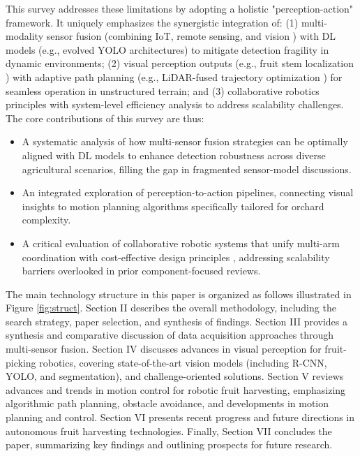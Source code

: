 \documentclass[a4paper,fleqn]{cas-dc}
\begin{document}
This survey addresses these limitations by adopting a holistic "perception-action" framework. It uniquely emphasizes the synergistic integration of: (1) multi-modality sensor fusion (combining IoT, remote sensing, and vision \cite{mohamed2021smart,martos2021ensuring,liu2024hierarchical}) with DL models (e.g., evolved YOLO architectures) to mitigate detection fragility in dynamic environments; (2) visual perception outputs (e.g., fruit stem localization \cite{li2023mta}) with adaptive path planning (e.g., LiDAR-fused trajectory optimization \cite{liu2024hierarchical}) for seamless operation in unstructured terrain; and (3) collaborative robotics principles \cite{lytridis2021overview,li2023multi} with system-level efficiency analysis to address scalability challenges.
The core contributions of this survey are thus:
\begin{itemize}
\item A systematic analysis of how multi-sensor fusion strategies can be optimally aligned with DL models to enhance detection robustness across diverse agricultural scenarios, filling the gap in fragmented sensor-model discussions.
\item An integrated exploration of perception-to-action pipelines, connecting visual insights %
 to motion planning algorithms
 specifically tailored for orchard complexity.
\item A critical evaluation of collaborative robotic systems that unify multi-arm coordination %
with cost-effective design principles 
, addressing scalability barriers overlooked in prior component-focused reviews.
\end{itemize}

The main technology structure in this paper is organized as follows illustrated in Figure \ref{fig:struct}. Section II describes the overall methodology, including the search strategy, paper selection, and synthesis of findings. Section III provides a synthesis and comparative discussion of data acquisition approaches through multi-sensor fusion.
Section IV discusses advances in visual perception for fruit-picking robotics, covering state-of-the-art vision models (including R-CNN, YOLO, and segmentation), and challenge-oriented solutions. Section V reviews advances and trends in motion control for robotic fruit harvesting, emphasizing algorithmic path planning, obstacle avoidance, and developments in motion planning and control. Section VI presents recent progress and future directions in autonomous fruit harvesting technologies. Finally, Section VII concludes the paper, summarizing key findings and outlining prospects for future research.
\end{document}
